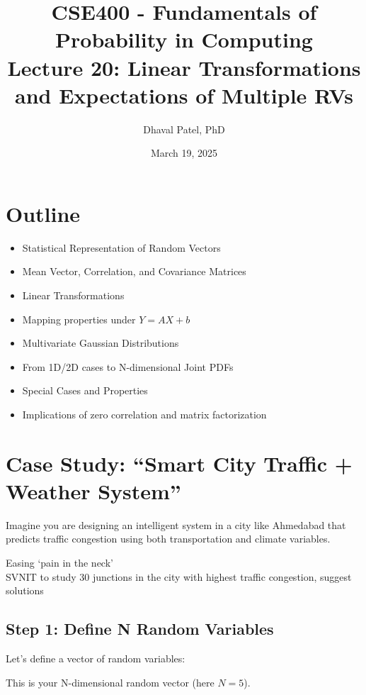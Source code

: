 \documentclass[12pt]{article}
\begin{document}
\title{CSE400 - Fundamentals of Probability in Computing\\
Lecture 20: Linear Transformations and Expectations of Multiple RVs}
\author{Dhaval Patel, PhD}
\date{March 19, 2025}
\maketitle

\section*{Outline}

\begin{itemize}
    \item Statistical Representation of Random Vectors
    \item Mean Vector, Correlation, and Covariance Matrices
    \item Linear Transformations
    \item Mapping properties under $Y = AX + b$
    \item Multivariate Gaussian Distributions
    \item From 1D/2D cases to N-dimensional Joint PDFs
    \item Special Cases and Properties
    \item Implications of zero correlation and matrix factorization
\end{itemize}

\section*{Case Study: “Smart City Traffic + Weather System”}

Imagine you are designing an intelligent system in a city like Ahmedabad that predicts traffic congestion using both transportation and climate variables.

Easing ‘pain in the neck’ \\
SVNIT to study 30 junctions in the city with highest traffic congestion, suggest solutions

\subsection*{Step 1: Define N Random Variables}

Let’s define a vector of random variables:

This is your N-dimensional random vector (here $N = 5$).
\end{document}
